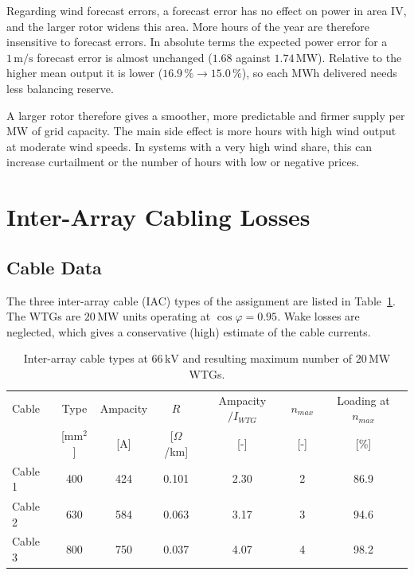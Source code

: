 Regarding wind forecast errors, a forecast error has no effect on power in area IV, and the larger rotor widens this area. More hours of the year are therefore insensitive to forecast errors. In absolute terms the expected power error for a $1\,\mathrm{m/s}$ forecast error is almost unchanged ($1.68$ against $1.74\,\mathrm{MW}$). Relative to the higher mean output it is lower ($16.9\,\% \rightarrow 15.0\,\%$), so each MWh delivered needs less balancing reserve.

A larger rotor therefore gives a smoother, more predictable and firmer supply per MW of grid capacity. The main side effect is more hours with high wind output at moderate wind speeds. In systems with a very high wind share, this can increase curtailment or the number of hours with low or negative prices.

\section{Inter-Array Cabling Losses}
\label{sec:elec-part2}

\subsection{Cable Data}
\label{sec:elec-cable-data}
The three inter-array cable (IAC) types of the assignment are listed in Table~\ref{tab:elec-cables}. The WTGs are $20\,\mathrm{MW}$ units operating at $\cos\varphi = 0.95$. Wake losses are neglected, which gives a conservative (high) estimate of the cable currents.

\begin{table}[H]
    \centering
    \caption{Inter-array cable types at $66\,\mathrm{kV}$ and resulting maximum number of $20\,\mathrm{MW}$ WTGs.}
    \label{tab:elec-cables}
    \begin{tabular}{lcccccc}
        \hline
        Cable & Type & Ampacity & $R$ & Ampacity$/I_{WTG}$ & $n_{max}$ & Loading at $n_{max}$ \\
        & [$\mathrm{mm^2}$] & [A] & [$\Omega$/km] & [-] & [-] & [\%] \\
        \hline
        Cable 1 & 400 & 424 & 0.101 & 2.30 & 2 & 86.9 \\
        Cable 2 & 630 & 584 & 0.063 & 3.17 & 3 & 94.6 \\
        Cable 3 & 800 & 750 & 0.037 & 4.07 & 4 & 98.2 \\
        \hline
    \end{tabular}
\end{table}

